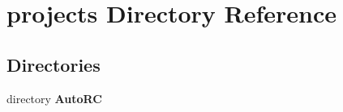 \section{projects Directory Reference}
\label{dir_a9ec1ef424966475f993eb98877e3088}
\subsection*{Directories}
\begin{DoxyCompactItemize}
\item 
directory \textbf{ Auto\+RC}
\end{DoxyCompactItemize}
